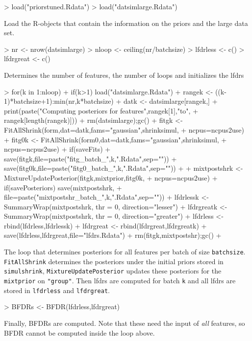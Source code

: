 \documentclass[11pt]{article}
\begin{document}
\begin{Schunk}
\begin{Sinput}
> load("priorstuned.Rdata")
> load("datsimlarge.Rdata")
\end{Sinput}
\end{Schunk}
Load the R-objects that contain the information on the priors and the large data set.

\begin{Schunk}
\begin{Sinput}
> nr <- nrow(datsimlarge)
> nloop <- ceiling(nr/batchsize)
> lfdrless <- c()
> lfdrgreat <- c()
\end{Sinput}
\end{Schunk}
Determines the number of features, the number of loops and initializes the lfdrs

\begin{Schunk}
\begin{Sinput}
> for(k in 1:nloop){
+ if(k>1) load("datsimlarge.Rdata")
+ rangek <- ((k-1)*batchsize+1):min(nr,k*batchsize)
+ datk <- datsimlarge[rangek,]
+ print(paste("Computing posteriors for features",rangek[1],"to",
+ rangek[length(rangek)]))
+ rm(datsimlarge);gc()
+ fitgk <- FitAllShrink(form,dat=datk,fams="gaussian",shrinksimul,
+ ncpus=ncpus2use)
+ fitg0k <- FitAllShrink(form0,dat=datk,fams="gaussian",shrinksimul,
+ ncpus=ncpus2use)
+ if(saveFits) {
+     save(fitgk,file=paste("fitg_batch_",k,".Rdata",sep=""))
+     save(fitg0k,file=paste("fitg0_batch_",k,".Rdata",sep=""))
+     }
+ mixtpostshrk <- MixtureUpdatePosterior(fitgk,mixtprior,fitg0k,
+ ncpus=ncpus2use)
+ if(savePosteriors) save(mixtpostshrk,
+ file=paste("mixtpostshr_batch_",k,".Rdata",sep=""))
+ lfdrlessk <- SummaryWrap(mixtpostshrk, thr = 0, direction="lesser")
+ lfdrgreatk <- SummaryWrap(mixtpostshrk, thr = 0, direction="greater")
+ lfdrless <- rbind(lfdrless,lfdrlessk)
+ lfdrgreat <- rbind(lfdrgreat,lfdrgreatk)
+ save(lfdrless,lfdrgreat,file="lfdrs.Rdata")
+ rm(fitgk,mixtpostshr);gc()
+ }
\end{Sinput}
\end{Schunk}
The loop that determines posteriors for all features per batch of size {\tt batchsize}. {\tt FitAllShrink} determines the
posteriors under the initial priors stored in {\tt simulshrink}, {\tt MixtureUpdatePosterior} updates these posteriors
for the {\tt mixtprior} on {\tt "group"}.  Then lfdrs are computed for batch {\tt k} and all lfdrs are stored in
{\tt lfdrless} and {\tt lfdrgreat}.

\begin{Schunk}
\begin{Sinput}
> BFDRs <- BFDR(lfdrless,lfdrgreat)
\end{Sinput}
\end{Schunk}
Finally, BFDRs are computed. Note that these need the input of \emph{all} features, so BFDR cannot
be computed inside the loop above.
\end{document}
